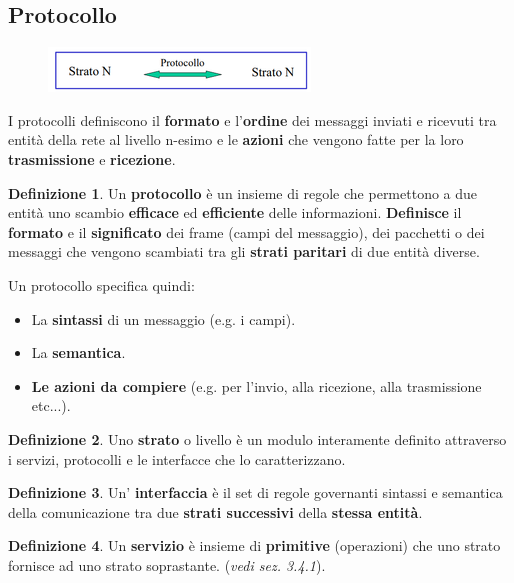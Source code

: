 \documentclass[11pt,a4paper]{article}
\theoremstyle{definition}
\newtheorem{definition}{Definizione}[section]
\begin{document}
\subsection{Protocollo}
\begin{figure}[!h]
	\includegraphics[scale=0.5]{Immagini/Protocollo.png}
	\centering
\end{figure}
I protocolli definiscono il \textbf{formato} e l’\textbf{ordine} dei
messaggi inviati e ricevuti tra entità della rete al livello n-esimo e
le \textbf{azioni} che vengono fatte per la loro \textbf{trasmissione} e
\textbf{ricezione}.
\theoremstyle{definition}
\begin{definition}
	Un \textbf{protocollo} è un insieme di regole che permettono a due entità uno scambio \textbf{efficace} ed \textbf{efficiente} delle informazioni. \textbf{Definisce} il \textbf{formato} e il
	\textbf{significato} dei frame (campi del messaggio), dei pacchetti o dei messaggi
	che vengono scambiati tra gli \textbf{strati paritari} di due
	entità diverse.
\end{definition}
Un protocollo specifica quindi:
\begin{itemize}
	\item La \textbf{sintassi} di un messaggio (e.g. i campi).
	\item La \textbf{semantica}.
	\item  \textbf{Le azioni da compiere }(e.g. per l'invio, alla ricezione, alla trasmissione etc...).
\end{itemize}
\theoremstyle{definition}
\begin{definition}
	Uno \textbf{strato} o livello è un modulo interamente definito attraverso i
	servizi, protocolli e le interfacce che lo caratterizzano.
\end{definition}
\theoremstyle{definition}
\begin{definition}
	Un' \textbf{interfaccia} è il set di regole governanti sintassi e semantica della comunicazione tra due \textbf{strati successivi} della \textbf{stessa entità}.
\end{definition}
\theoremstyle{definition}
\begin{definition}
	Un \textbf{servizio} è insieme di \textbf{primitive} (operazioni) che uno strato
	fornisce ad uno strato soprastante. (\textit{vedi sez. 3.4.1}).
\end{definition}
\end{document}

